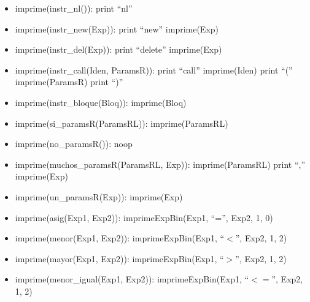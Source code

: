 \documentclass[11pt]{article}
\begin{document}
\begin{itemize}
            \item imprime(instr\_nl()):
                \subitem print “nl”
            
            \item imprime(instr\_new(Exp)):
                \subitem print “new”
                \subitem imprime(Exp)
            
            \item imprime(instr\_del(Exp)):
                \subitem print “delete”
                \subitem imprime(Exp)
            
            \item imprime(instr\_call(Iden, ParamsR)):
                \subitem print “call”
                \subitem imprime(Iden)
                \subitem print “(”
                \subitem imprime(ParamsR)
                \subitem print “)”
            
            \item imprime(instr\_bloque(Bloq)):
                \subitem imprime(Bloq)
            
            \item imprime(si\_paramsR(ParamsRL)):
                \subitem imprime(ParamsRL)
            
            \item imprime(no\_paramsR()): noop
            
            \item imprime(muchos\_paramsR(ParamsRL, Exp)):
                \subitem imprime(ParamsRL)
                \subitem print “,”
                \subitem imprime(Exp)
            
            \item imprime(un\_paramsR(Exp)):
                \subitem imprime(Exp)
            
            \item imprime(asig(Exp1, Exp2)):
                \subitem imprimeExpBin(Exp1, “=”, Exp2, 1, 0)
            
            \item imprime(menor(Exp1, Exp2)):
                \subitem imprimeExpBin(Exp1, “$<$”, Exp2, 1, 2)
            
            \item imprime(mayor(Exp1, Exp2)):
                \subitem imprimeExpBin(Exp1, “$>$”, Exp2, 1, 2)
            
            \item imprime(menor\_igual(Exp1, Exp2)):
                \subitem imprimeExpBin(Exp1, “$<=$”, Exp2, 1, 2)
            

\end{itemize}
\end{document}

